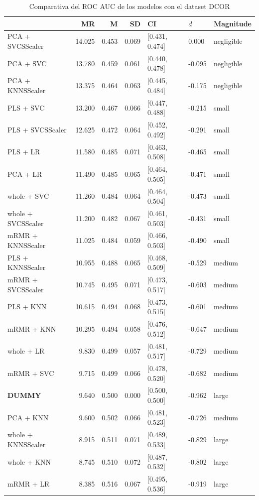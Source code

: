 \documentclass[a4paper,oneside,11pt,leqno]{article}
\begin{document}
	\begin{table}[h]
		\centering
		\begin{tabular}{lrrrlll}
			\toprule
			{} &     MR &     M &    SD &              CI &    $d$ &   Magnitude \\
			\midrule
			PCA + SVCSScaler   & 14.025 & 0.453 & 0.069 &  [0.431, 0.474] &  0.000 &  negligible \\
			PCA + SVC          & 13.780 & 0.459 & 0.061 &  [0.440, 0.478] & -0.095 &  negligible \\
			PCA + KNNSScaler   & 13.375 & 0.464 & 0.063 &  [0.445, 0.484] & -0.175 &  negligible \\
			PLS + SVC          & 13.200 & 0.467 & 0.066 &  [0.447, 0.488] & -0.215 &       small \\
			PLS + SVCSScaler   & 12.625 & 0.472 & 0.064 &  [0.452, 0.492] & -0.291 &       small \\
			PLS + LR           & 11.580 & 0.485 & 0.071 &  [0.463, 0.508] & -0.465 &       small \\
			PCA + LR           & 11.490 & 0.485 & 0.065 &  [0.464, 0.505] & -0.471 &       small \\
			whole + SVC        & 11.260 & 0.484 & 0.064 &  [0.464, 0.504] & -0.473 &       small \\
			whole + SVCSScaler & 11.200 & 0.482 & 0.067 &  [0.461, 0.503] & -0.431 &       small \\
			mRMR + KNNSScaler  & 11.025 & 0.484 & 0.059 &  [0.466, 0.503] & -0.490 &       small \\
			PLS + KNNSScaler   & 10.955 & 0.488 & 0.065 &  [0.468, 0.509] & -0.529 &      medium \\
			mRMR + SVCSScaler  & 10.745 & 0.495 & 0.071 &  [0.473, 0.517] & -0.603 &      medium \\
			PLS + KNN          & 10.615 & 0.494 & 0.068 &  [0.473, 0.515] & -0.601 &      medium \\
			mRMR + KNN         & 10.295 & 0.494 & 0.058 &  [0.476, 0.512] & -0.647 &      medium \\
			whole + LR         &  9.830 & 0.499 & 0.057 &  [0.481, 0.517] & -0.729 &      medium \\
			mRMR + SVC         &  9.715 & 0.499 & 0.066 &  [0.478, 0.520] & -0.682 &      medium \\
			 \textbf{DUMMY}              &  9.640 & 0.500 & 0.000 &  [0.500, 0.500] & -0.962 &       large \\
			PCA + KNN          &  9.600 & 0.502 & 0.066 &  [0.481, 0.523] & -0.726 &      medium \\
			whole + KNNSScaler &  8.915 & 0.511 & 0.071 &  [0.489, 0.533] & -0.829 &       large \\
			whole + KNN        &  8.745 & 0.510 & 0.072 &  [0.487, 0.532] & -0.802 &       large \\
			mRMR + LR          &  8.385 & 0.516 & 0.067 &  [0.495, 0.536] & -0.919 &       large \\
			\bottomrule
		\end{tabular}
			\caption{Comparativa del ROC AUC de los modelos con el dataset DCOR}
			\label{tab:stat_results_dcor}
	\end{table}
\end{document}
